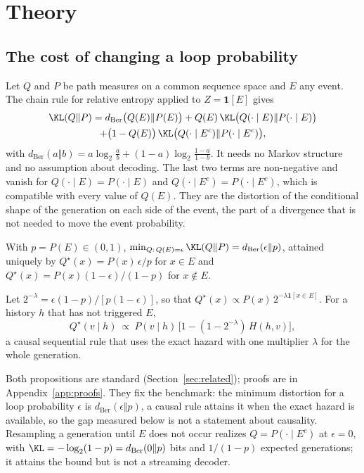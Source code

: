 \section{Theory}\label{sec:theory}

\subsection{The cost of changing a loop probability}\label{ssec:bernoulli-bound}
Let $Q$ and $P$ be path measures on a common sequence space and $E$ any event. The chain rule for relative entropy applied to $Z=\mathbf{1}[E]$ gives
\begin{multline}\label{eq:decomp}
\KL(Q\Vert P)=d_{\mathrm{Ber}}\big(Q(E)\Vert P(E)\big)+Q(E)\,\KL\big(Q(\cdot\mid E)\Vert P(\cdot\mid E)\big)\\
+\big(1-Q(E)\big)\,\KL\big(Q(\cdot\mid E^c)\Vert P(\cdot\mid E^c)\big),
\end{multline}
with $d_{\mathrm{Ber}}(a\Vert b)=a\log_2\frac ab+(1-a)\log_2\frac{1-a}{1-b}$. It needs no Markov structure and no assumption about decoding. The last two terms are non-negative and vanish for $Q(\cdot\mid E)=P(\cdot\mid E)$ and $Q(\cdot\mid E^c)=P(\cdot\mid E^c)$, which is compatible with every value of $Q(E)$. They are the distortion of the conditional shape of the generation on each side of the event, the part of a divergence that is not needed to move the event probability.

\begin{prop}\label{prop:min}
With $p=P(E)\in(0,1)$, $\min_{Q:\,Q(E)=\epsilon}\KL(Q\Vert P)=d_{\mathrm{Ber}}(\epsilon\Vert p)$, attained uniquely by $Q^\star(x)=P(x)\,\epsilon/p$ for $x\in E$ and $Q^\star(x)=P(x)(1-\epsilon)/(1-p)$ for $x\notin E$.
\end{prop}

\begin{prop}\label{prop:causal}
Let $2^{-\lambda}=\epsilon(1-p)/[p(1-\epsilon)]$, so that $Q^\star(x)\propto P(x)\,2^{-\lambda\mathbf{1}[x\in E]}$. For a history $h$ that has not triggered $E$,
\[
Q^\star(v\mid h)\ \propto\ P(v\mid h)\,\big[1-(1-2^{-\lambda})\,H(h,v)\big],
\]
a causal sequential rule that uses the exact hazard with one multiplier $\lambda$ for the whole generation.
\end{prop}

Both propositions are standard (Section~\ref{sec:related}); proofs are in Appendix~\ref{app:proofs}. They fix the benchmark: the minimum distortion for a loop probability $\epsilon$ is $d_{\mathrm{Ber}}(\epsilon\Vert p)$, a causal rule attains it when the exact hazard is available, so the gap measured below is not a statement about causality. Resampling a generation until $E$ does not occur realizes $Q=P(\cdot\mid E^c)$ at $\epsilon=0$, with $\KL=-\log_2(1-p)=d_{\mathrm{Ber}}(0\Vert p)$ bits and $1/(1-p)$ expected generations; it attains the bound but is not a streaming decoder.

